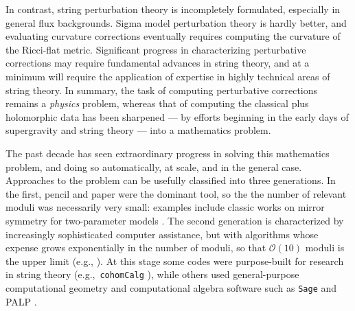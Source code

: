\documentclass[12pt,a4wide]{article}
\begin{document}
In contrast, string perturbation theory is incompletely formulated, especially in general flux backgrounds.
Sigma model perturbation theory is hardly better, and evaluating curvature corrections eventually requires computing the curvature of the Ricci-flat metric.  
Significant progress in characterizing perturbative corrections may require fundamental advances in string theory, and at a minimum will require the application of expertise in highly technical areas of string theory.  In summary, the task of computing perturbative corrections remains a \emph{physics} problem, whereas that of computing the classical plus holomorphic data has been sharpened --- by efforts beginning in the early days of supergravity 
and string theory --- into a mathematics problem.

The past decade has seen extraordinary progress in solving this mathematics problem, and doing so automatically, at scale, and in the general case. 
Approaches to the problem 
can be usefully classified into three generations.  In the first, pencil and paper were the dominant tool, so the 
the number of relevant moduli was necessarily very small: examples include classic works on mirror symmetry for two-parameter models \cite{Candelas:1993dm,Candelas:1994hw}.
The second generation is characterized by increasingly sophisticated computer assistance, but with algorithms whose expense grows exponentially in the number of moduli, so that $\mathcal{O}(10)$ moduli is the upper limit (e.g., \cite{Altman:2014bfa}).
At this stage some codes were purpose-built for research in string theory (e.g.,~\texttt{cohomCalg} \cite{Blumenhagen:2010pv}), while others used general-purpose computational geometry and computational algebra software such as \texttt{Sage} and PALP \cite{Kreuzer:2002uu}.
\end{document}
